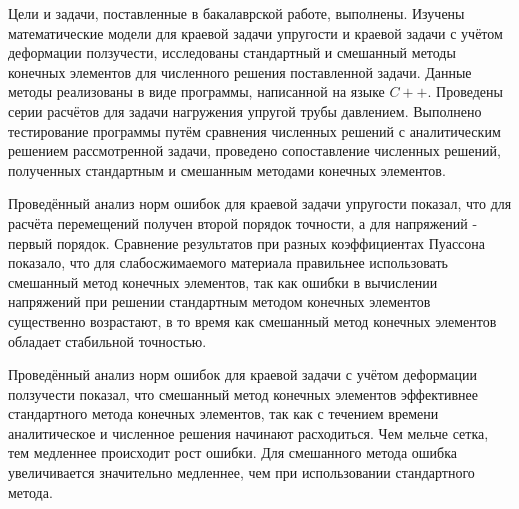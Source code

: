 \documentclass[a4paper,14pt]{extarticle}
\begin{document}
Цели и задачи, поставленные в бакалаврской работе, выполнены. Изучены математические модели для краевой задачи упругости и краевой задачи с учётом деформации ползучести, исследованы стандартный и смешанный методы конечных элементов для численного решения поставленной задачи. Данные методы реализованы в виде программы, написанной на языке $C++$. Проведены серии расчётов для задачи нагружения упругой трубы давлением. Выполнено тестирование программы путём сравнения численных решений с аналитическим решением рассмотренной задачи, проведено сопоставление численных решений, полученных стандартным и смешанным методами конечных элементов. 

Проведённый анализ норм ошибок для краевой задачи упругости показал, что для расчёта перемещений получен второй порядок точности, а для напряжений - первый порядок. Сравнение результатов при разных коэффициентах Пуассона показало, что для слабосжимаемого материала правильнее использовать смешанный метод конечных элементов, так как ошибки в вычислении напряжений при решении стандартным методом конечных элементов существенно возрастают, в то время как смешанный метод конечных элементов обладает стабильной точностью.

Проведённый анализ норм ошибок для краевой задачи с учётом деформации ползучести показал, что смешанный метод конечных элементов эффективнее стандартного метода конечных элементов, так как с течением времени аналитическое и численное решения начинают расходиться. Чем мельче сетка, тем медленнее происходит рост ошибки. Для смешанного метода ошибка увеличивается значительно медленнее, чем при использовании стандартного метода.
\end{document}
